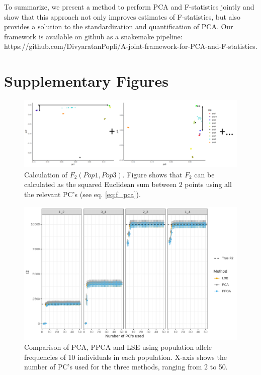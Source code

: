 \documentclass[12pt, letterpaper]{article}
\begin{document}
To summarize, we present a method to perform PCA and F-statistics jointly and show that this approach not only improves estimates of F-statistics, but also provides a solution to the standardization and quantification of PCA. Our framework is available on github as a snakemake pipeline: https://github.com/DivyaratanPopli/A-joint-framework-for-PCA-and-F-statistics.


\section{Supplementary Figures}

\begin{figure}[ht!]
    \includegraphics[width=16.5cm]{inkscape/pca.png}
    \centering
    \caption{Calculation of $F_2(Pop1,Pop3)$. Figure shows that $F_2$ can be calculated as the squared Euclidean sum between 2 points using all the relevant PC's (see eq. \ref{eq:f_pca}).}
    \label{figS1:pc_scale}
\end{figure}

\begin{figure}[ht!]
    \includegraphics[width=16.5cm]{plots/supplementary/Ne1000_split_times1000_npop10_nind100_mu0_f2_plot_scale_test.png}
    \centering
    \caption{Comparison of PCA, PPCA and LSE using population allele frequencies of 10 individuals in each population. X-axis shows the number of PC's used for the three methods, ranging from 2 to 50.}
    \label{figS1:pc_scale}
\end{figure}
\end{document}
